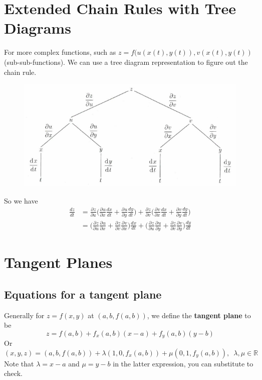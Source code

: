 \section{Extended Chain Rules with Tree Diagrams}
For more complex functions, such as \( z = f(u(x(t), y(t)), v(x(t), y(t)) \)
(sub-sub-functions). We can use a tree diagram representation to figure out the
chain rule.
\begin{figure}[h!]
  \centering
  \includegraphics[width=0.6\linewidth]{./lectures/DeepinScreenshot_select-area_20191030114146.png}
\end{figure}

So we have 
\begin{align*}
\frac{dz}{dt} &= 
  \frac{\partial^{}{z}}{\partial{u}^{}}\Big(
    \frac{\partial^{}{u}}{\partial{x}^{}} \frac{dx}{dt}
  + \frac{\partial^{}{u}}{\partial{y}^{}} \frac{dy}{dt}\Big
  ) + \frac{\partial^{}{z}}{\partial{v}^{}}\Big(
    \frac{\partial^{}{v}}{\partial{x}^{}} \frac{dx}{dt}
  + \frac{\partial^{}{v}}{\partial{y}^{}} \frac{dy}{dt}\Big )\\
  &= \Big ( \frac{\partial^{}{z}}{\partial{u}^{}}
    \frac{\partial^{}{u}}{\partial{x}^{}}
    + \frac{\partial^{}{z}}{\partial{v}^{}}
    \frac{\partial^{}{v}}{\partial{x}^{}}\Big ) \frac{dx}{dt} + \Big
    ( \frac{\partial^{}{z}}{\partial{u}^{}}
    \frac{\partial^{}{u}}{\partial{y}^{}}
    + \frac{\partial^{}{z}}{\partial{v}^{}}
  \frac{\partial^{}{v}}{\partial{y}^{}}\Big) \frac{dy}{dt}
\end{align*}

%

\section{Tangent Planes}
\subsection{Equations for a tangent plane}
Generally for \( z = f(x,y) \) at \( (a,b, f(a,b)) \), we define the
\textbf{tangent plane} to be
\[ 
  z = f(a,b) + f_x(a,b)(x-a) + f_y(a,b)(y-b)
\]
Or
\[ 
  (x,y,z) = (a,b, f(a,b)) + \lambda(1,0, f_x(a,b)) + \mu(0,1, f_y(a,b)),
  \enspace \lambda, \mu \in \mathbb{R} 
\]
Note that \( \lambda = x - a \) and \( \mu = y - b  \) in the latter
expression, you can substitute to check.

